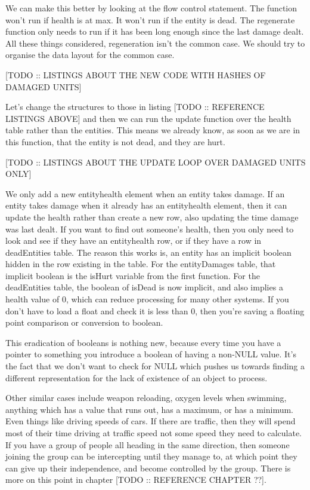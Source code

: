 \documentclass[a4paper,12pt]{article}
\begin{document}
We can make this better by looking at the flow control statement.
The function won't run if health is at max.
It won't run if the entity is dead.
The regenerate function only needs to run if it has been long enough since the last damage dealt.
All these things considered, regeneration isn't the common case.
We should try to organise the data layout for the common case.

[TODO :: LISTINGS ABOUT THE NEW CODE WITH HASHES OF DAMAGED UNITS]

Let's change the structures to those in listing [TODO :: REFERENCE LISTINGS ABOVE] and then we can run the update function over the health table rather than the entities.
This means we already know, as soon as we are in this function, that the entity is not dead, and they are hurt.

[TODO :: LISTINGS ABOUT THE UPDATE LOOP OVER DAMAGED UNITS ONLY]

We only add a new entityhealth element when an entity takes damage.
If an entity takes damage when it already has an entityhealth element, then it can update the health rather than create a new row, also updating the time damage was last dealt.
If you want to find out someone's health, then you only need to look and see if they have an entityhealth row, or if they have a row in deadEntities table.
The reason this works is, an entity has an implicit boolean hidden in the row existing in the table.
For the entityDamages table, that implicit boolean is the isHurt variable from the first function.
For the deadEntities table, the boolean of isDead is now implicit, and also implies a health value of 0, which can reduce processing for many other systems.
If you don't have to load a float and check it is less than 0, then you're saving a floating point comparison or conversion to boolean.

This eradication of booleans is nothing new, because every time you have a pointer to something you introduce a boolean of having a non-NULL value.
It's the fact that we don't want to check for NULL which pushes us towards finding a different representation for the lack of existence of an object to process.

Other similar cases include weapon reloading, oxygen levels when swimming, anything which has a value that runs out, has a maximum, or has a minimum.
Even things like driving speeds of cars.
If there are traffic, then they will spend most of their time driving at traffic speed not some speed they need to calculate.
If you have a group of people all heading in the same direction, then someone joining the group can be intercepting until they manage to, at which point they can give up their independence, and become controlled by the group.
There is more on this point in chapter [TODO :: REFERENCE CHAPTER ??].
\end{document}
